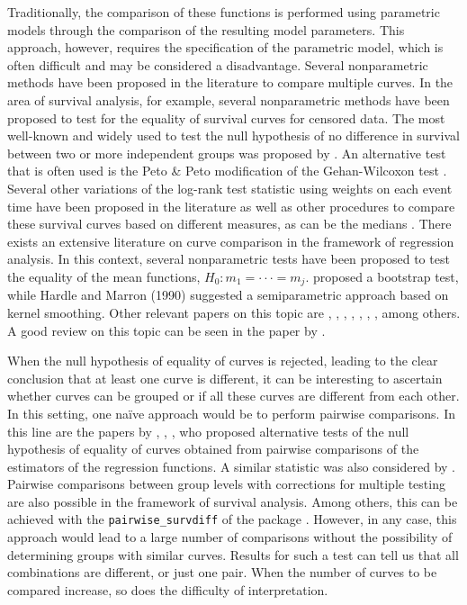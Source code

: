 Traditionally, the comparison of these functions is performed using parametric models through the comparison of the resulting model parameters. This approach, however, requires the specification of the parametric model, which is often difficult and may be considered a disadvantage. Several nonparametric methods have been proposed in the literature to compare multiple curves. In the area of survival analysis, for example, several nonparametric methods have been proposed to test for the equality of survival curves for censored data. The most well-known and widely used to test the null hypothesis of no difference in survival between two or more independent groups was proposed by \citet{mantel}. An alternative test that is often used is the Peto \& Peto \citep{CIS-11103} modification of the Gehan-Wilcoxon test \citep{10.2307/2333825}.  Several other variations of the log-rank test statistic using weights on each event time have been proposed in the literature \citep{CIS-23788,doi:10.1093/biomet/69.3.553,10.2307/2289169} as well as other procedures to compare these survival curves based on different measures, as can be the medians \citep{Chen2016}. There exists an extensive literature on curve comparison in the framework of regression analysis. In this context, several nonparametric tests have been proposed to test the equality of the mean functions, $H_0:m_1=\cdot \cdot \cdot =m_j$. \citet{hall1990}  proposed a bootstrap test, while \citet{hardle} Hardle and Marron (1990) suggested a semiparametric approach based on kernel smoothing. Other relevant papers on this topic are  \citet{king91} , \citet{Delgado} , \citet{kulasekera95} , \citet{bowman95}, \citet{dette2001}, \citet{Pardo} , \citet{Srihera:2010:NCR:1837522.1837642} , among others. A good review on this topic can be seen in the paper by \citet{neumeyer03}.

When the null hypothesis of equality of curves is rejected, leading to the clear conclusion that at least one curve is different, it can be interesting to ascertain whether curves can be grouped or if all these curves are different from each other. In this setting, one naïve approach would be to perform pairwise comparisons. In this line are the papers by \citet{Rosenblatt1975}, \citet{cao}, \citet{hardle}, \citet{dette2001} who proposed alternative tests of the null hypothesis of equality of curves obtained from pairwise comparisons of the estimators of the regression functions. A similar statistic was also considered by \citet{king91}. Pairwise comparisons between group levels with corrections for multiple testing are also possible in the framework of survival analysis. Among others, this can be achieved with the \texttt{pairwise\_survdiff} of the package  \citep{survminer}. However, in any case, this approach would lead to a large number of comparisons without the possibility of determining groups with similar curves. Results for such a test can tell us that all combinations are different, or just one pair. When the number of curves to be compared increase, so does the difficulty of interpretation.

